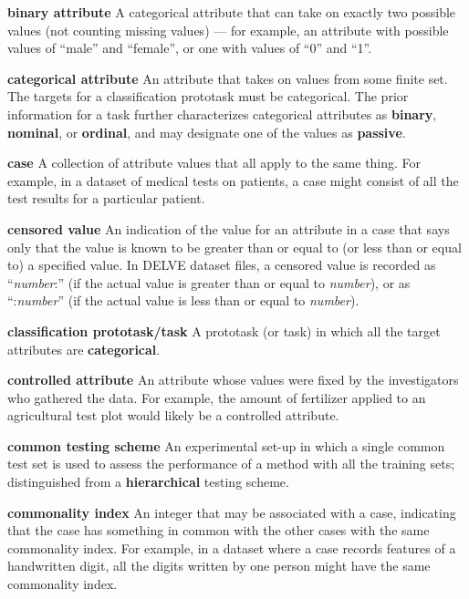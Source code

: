 \begin{list}{}{%
\setlength{\itemsep}{0in}%
\setlength{\leftmargin}{2.25in}%
\setlength{\labelsep}{0in}%
\setlength{\labelwidth}{2.25in}}
\item[\bf binary attribute \hfill] 
A categorical attribute that can take on exactly two possible values 
(not counting missing values) --- for example, an attribute with possible 
values of ``male'' and ``female'', or one with values of ``0'' and ``1''.

\item[\bf categorical attribute \hfill]
An attribute that takes on values from some finite set.  The targets for
a classification prototask must be categorical.  The prior information for 
a task further characterizes categorical attributes as {\bf binary},
{\bf nominal}, or {\bf ordinal}, and may designate one of the values
as {\bf passive}.

\item[\bf case \hfill]
A collection of attribute values that all apply to the same thing.  For
example, in a dataset of medical tests on patients, a case might consist
of all the test results for a particular patient.

\item[\bf censored value \hfill]
An indication of the value for an attribute in a case that says
only that the value is known to be greater than or equal to (or less
than or equal to) a specified value.  In DELVE dataset files, a
censored value is recorded as ``{\em number\/}:'' (if the actual value is
greater than or equal to {\em number\/}), or as ``:{\em number\/}'' (if the 
actual value is less than or equal to {\em number\/}).

\item[\bf classification prototask/task \hfill]
A prototask (or task) in which all the target attributes are
{\bf categorical}.

\item[\bf controlled attribute \hfill]
An attribute whose values were fixed by the investigators who gathered
the data.  For example, the amount of fertilizer applied to an agricultural
test plot would likely be a controlled attribute.

\item[\bf common testing scheme \hfill]
An experimental set-up in which a single common test set is used to
assess the performance of a method with all the training sets; distinguished
from a {\bf hierarchical} testing scheme.

\item[\bf commonality index \hfill] 
An integer that may be associated with a case, indicating that the
case has something in common with the other cases with the same
commonality index.  For example, in a dataset where a case records
features of a handwritten digit, all the digits written by one person 
might have the same commonality index.


\end{list}
